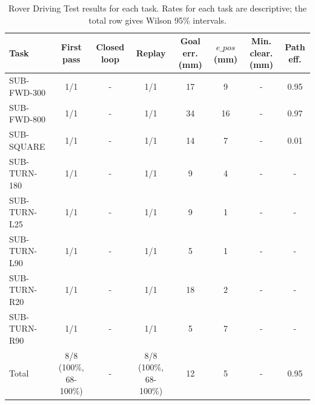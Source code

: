 \begin{table}[htbp]
\centering
\caption{Rover Driving Test results for each task. Rates for each task are descriptive; the total row gives Wilson 95\% intervals.}
\label{tab:rdt_per_task}
\small
\begin{tabular}{lccccccc}
\toprule
Task & First pass & Closed loop & Replay & Goal err. (mm) & $e\_{pos}$ (mm) & Min. clear. (mm) & Path eff. \\
\midrule
SUB-FWD-300 & 1/1 & - & 1/1 & 17 & 9 & - & 0.95 \\
SUB-FWD-800 & 1/1 & - & 1/1 & 34 & 16 & - & 0.97 \\
SUB-SQUARE & 1/1 & - & 1/1 & 14 & 7 & - & 0.01 \\
SUB-TURN-180 & 1/1 & - & 1/1 & 9 & 4 & - & - \\
SUB-TURN-L25 & 1/1 & - & 1/1 & 9 & 1 & - & - \\
SUB-TURN-L90 & 1/1 & - & 1/1 & 5 & 1 & - & - \\
SUB-TURN-R20 & 1/1 & - & 1/1 & 18 & 2 & - & - \\
SUB-TURN-R90 & 1/1 & - & 1/1 & 5 & 7 & - & - \\
Total & 8/8 (100\%, 68-100\%) & - & 8/8 (100\%, 68-100\%) & 12 & 5 & - & 0.95 \\
\bottomrule
\end{tabular}
\end{table}
